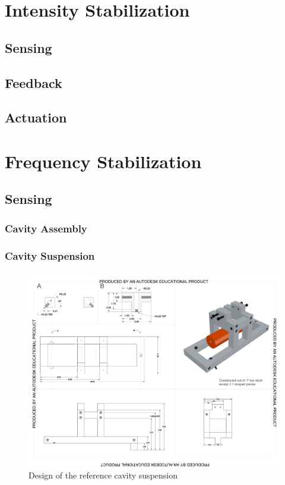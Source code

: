 \section{Intensity Stabilization}
\subsection{Sensing}

\subsection{Feedback}

\subsection{Actuation}


\section{Frequency Stabilization}

\subsection{Sensing}
\subsubsection{Cavity Assembly}
\subsubsection{Cavity Suspension}
\begin{figure}[htbp]
	\centering
		\includegraphics[width=15cm]{./figures/refcavsusdesign.pdf}
	\caption[Reference Cavity Suspension Design]{Design of the reference cavity suspension}
	\label{fig:refcav_sus}
\end{figure}

